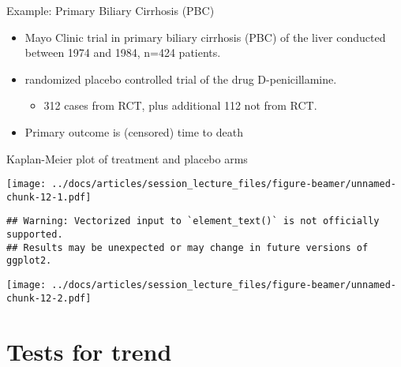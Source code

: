 \documentclass[
  ignorenonframetext,
]{beamer}
\providecommand{\tightlist}{%
  \setlength{\itemsep}{0pt}\setlength{\parskip}{0pt}}
\begin{document}
\begin{frame}{Example: Primary Biliary Cirrhosis (PBC)}
\protect\hypertarget{example-primary-biliary-cirrhosis-pbc}{}

\begin{itemize}
\tightlist
\item
  Mayo Clinic trial in primary biliary cirrhosis (PBC) of the liver
  conducted between 1974 and 1984, n=424 patients.
\item
  randomized placebo controlled trial of the drug D-penicillamine.

  \begin{itemize}
  \tightlist
  \item
    312 cases from RCT, plus additional 112 not from RCT.
  \end{itemize}
\item
  Primary outcome is (censored) time to death
\end{itemize}

\end{frame}

\begin{frame}[fragile]{Kaplan-Meier plot of treatment and placebo arms}
\protect\hypertarget{kaplan-meier-plot-of-treatment-and-placebo-arms}{}

\texttt{[image: ../docs/articles/session\_lecture\_files/figure-beamer/unnamed-chunk-12-1.pdf]}

\begin{verbatim}
## Warning: Vectorized input to `element_text()` is not officially supported.
## Results may be unexpected or may change in future versions of ggplot2.
\end{verbatim}

\texttt{[image: ../docs/articles/session\_lecture\_files/figure-beamer/unnamed-chunk-12-2.pdf]}

\end{frame}

\hypertarget{tests-for-trend}{%
\section{Tests for trend}\label{tests-for-trend}}
\end{document}
